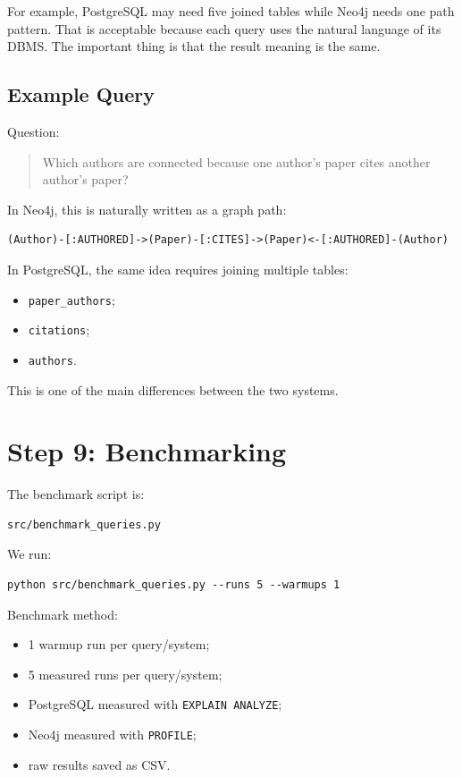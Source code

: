 \documentclass[11pt]{article}
\begin{document}
For example, PostgreSQL may need five joined tables while Neo4j needs one path pattern.
That is acceptable because each query uses the natural language of its DBMS.
The important thing is that the result meaning is the same.

\subsection{Example Query}

Question:

\begin{quote}
Which authors are connected because one author's paper cites another author's paper?
\end{quote}

In Neo4j, this is naturally written as a graph path:

\begin{verbatim}
(Author)-[:AUTHORED]->(Paper)-[:CITES]->(Paper)<-[:AUTHORED]-(Author)
\end{verbatim}

In PostgreSQL, the same idea requires joining multiple tables:

\begin{itemize}
    \item \texttt{paper\_authors};
    \item \texttt{citations};
    \item \texttt{authors}.
\end{itemize}

This is one of the main differences between the two systems.

\section{Step 9: Benchmarking}

The benchmark script is:

\begin{verbatim}
src/benchmark_queries.py
\end{verbatim}

We run:

\begin{verbatim}
python src/benchmark_queries.py --runs 5 --warmups 1
\end{verbatim}

Benchmark method:

\begin{itemize}
    \item 1 warmup run per query/system;
    \item 5 measured runs per query/system;
    \item PostgreSQL measured with \texttt{EXPLAIN ANALYZE};
    \item Neo4j measured with \texttt{PROFILE};
    \item raw results saved as CSV.
\end{itemize}
\end{document}
